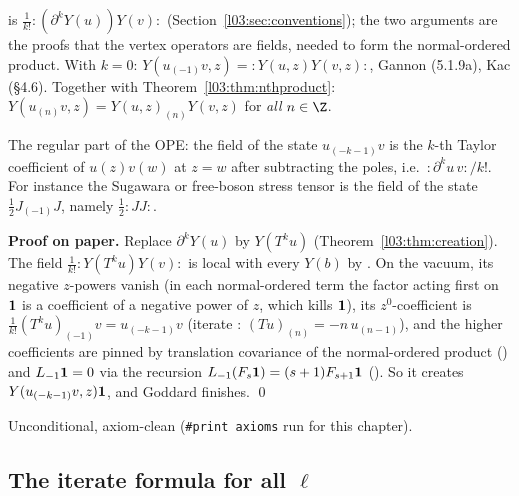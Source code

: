 \begin{dictionary}
 is $\frac1{k!}{:}(\partial^kY(u))Y(v){:}$
(Section~\ref{l03:sec:conventions}); the two  arguments are the proofs that the
vertex operators are fields, needed to form the normal-ordered product. With $k = 0$:
$Y(u_{(-1)}v,z) = {:}Y(u,z)Y(v,z){:}$, Gannon (5.1.9a), Kac (§4.6). Together with
Theorem~\ref{l03:thm:nthproduct}: $Y(u_{(n)}v,z) = Y(u,z)_{(n)}Y(v,z)$ for \emph{all} $n\in\Z$.
\end{dictionary}

\begin{physics}
The regular part of the OPE: the field of the state $u_{(-k-1)}v$ is the $k$-th Taylor coefficient of
$u(z)v(w)$ at $z = w$ after subtracting the poles, i.e.\ ${:}\partial^ku\,v{:}/k!$. For instance the
Sugawara or free-boson stress tensor is the field of the state $\frac12 J_{(-1)}J$, namely
$\frac12{:}JJ{:}$.
\end{physics}

\textbf{Proof on paper.} Replace $\partial^kY(u)$ by $Y(T^ku)$ (Theorem~\ref{l03:thm:creation}). The
field $\frac1{k!}{:}Y(T^ku)Y(v){:}$ is local with every $Y(b)$ by . On the vacuum,
its negative $z$-powers vanish (in each normal-ordered term the factor acting first on
$\mathbf{1}$ is a coefficient of a negative power of $z$, which kills $\mathbf{1}$), its $z^0$-coefficient is $\frac1{k!}(T^ku)_{(-1)}v = u_{(-k-1)}v$ (iterate
: $(Tu)_{(n)} = -n\,u_{(n-1)}$), and the higher coefficients are pinned by translation
covariance of the normal-ordered product () and $L_{-1}\mathbf{1} = 0$ via the
recursion $L_{-1}(F_s\mathbf{1}) = (s+1)F_{s+1}\mathbf{1}$ (). So it creates
$Y(u_{(-k-1)}v,z)\mathbf{1}$, and Goddard finishes. \qed

\begin{status}
Unconditional, axiom-clean (\texttt{\#print axioms}  run for this
chapter).
\end{status}

\subsection{The iterate formula for all \texorpdfstring{$\ell$}{l}}

